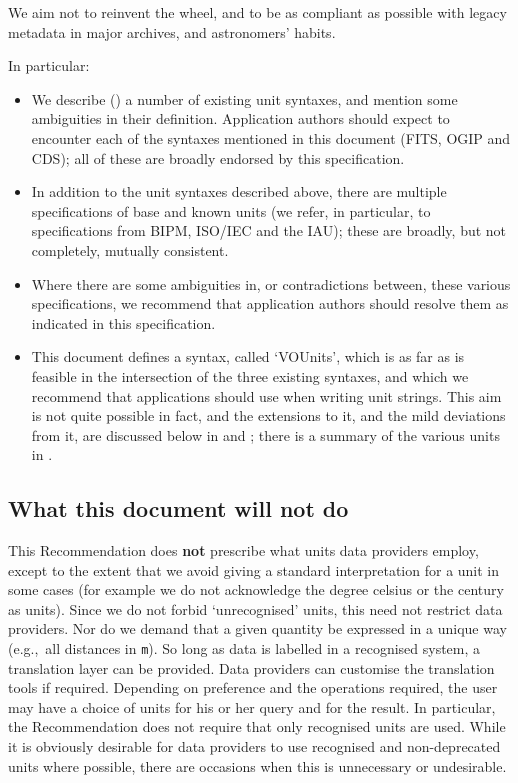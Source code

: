 \documentclass[11pt,a4paper]{ivoa}
\newcommand{\unit}[1]{\texttt{\small\color{orange}#1}}
\def\eg{e.g.,~}
\begin{document}
We aim not to reinvent the wheel, and to be as compliant as possible with
legacy metadata in major archives, and astronomers' habits.

In particular:
\begin{itemize}
\item We describe () a number of existing unit
  syntaxes, and mention some ambiguities in their
  definition. Application authors should expect to encounter each of
  the syntaxes mentioned in this document (FITS, OGIP and CDS); all of
  these are broadly endorsed by this specification.
\item In addition to the unit syntaxes described above, there are
  multiple specifications of base and known units
  (we refer, in particular, to
  specifications from BIPM, ISO/IEC and the IAU);
  these are broadly, but not completely, mutually consistent.
\item Where there are some ambiguities in, or contradictions between,
  these various specifications, we recommend that application authors should
  resolve them as indicated in this specification.
\item This document defines a syntax, called `VOUnits', which is as
  far as is feasible in the intersection of the three existing
  syntaxes, and which we recommend that applications should use when
  writing unit strings.  This aim is not quite possible in fact, and
  the extensions to it, and the mild deviations from it, are discussed
  below in  and ;
  there is a summary of the various units
  in .
\end{itemize}




\subsection{What this document will not do}
\label{sec:outofscope}

This Recommendation does \textbf{not} prescribe what units data
providers employ, except to the extent that we avoid giving a standard
interpretation for a unit in some cases (for example we do not
acknowledge the degree celsius or the century as units).  Since we do
not forbid `unrecognised' units, this need not restrict data providers.
Nor do we demand that a given quantity be expressed in a
unique way (\eg all distances in \unit{m}).  So long as data is
labelled in a recognised system, a translation layer can be
provided. Data providers can customise the translation tools if
required. Depending on preference and the operations required, the
user may have a choice of units for his or her query and for the
result.  In particular, the Recommendation does not require that only
recognised units are used.  While it is obviously desirable for data
providers to use recognised and non-deprecated units where possible,
there are occasions when this is unnecessary or undesirable.
\end{document}
